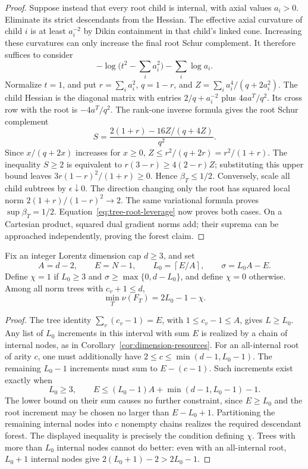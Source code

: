 \begin{proof}
Suppose instead that every root child is internal, with axial values
$a_i>0$.  Eliminate its strict descendants from the Hessian.  The
effective axial curvature of child $i$ is at least $a_i^{-2}$ by
Dikin containment in that child's linked cone.  Increasing these
curvatures can only increase the final root Schur complement.
It therefore suffices to consider
\[
 -\log\bigl(t^2-\textstyle\sum_i a_i^2\bigr)-\sum_i\log a_i.
\]
Normalize $t=1$, and put $r=\sum_i a_i^2$, $q=1-r$, and
$Z=\sum_i a_i^4/(q+2a_i^2)$.  The child Hessian is the diagonal
matrix with entries $2/q+a_i^{-2}$ plus $4aa^T/q^2$.
Its cross row with the root is $-4a^T/q^2$.  The rank-one inverse
formula gives the root Schur complement
\begin{equation}\label{eq:tree-schur-concrete}
 S=\frac{2(1+r)-16Z/(q+4Z)}{q^2}.
\end{equation}
Since $x/(q+2x)$ increases for $x\geq0$,
$Z\leq r^2/(q+2r)=r^2/(1+r)$.
The inequality $S\geq2$ is equivalent to
$r(3-r)\geq4(2-r)Z$; substituting this upper bound leaves
$3r(1-r)^2/(1+r)\geq0$.  Hence $\beta_T\leq1/2$.
Conversely, scale all child subtrees by $\epsilon\downarrow0$.
The direction changing only the root has squared local norm
$2(1+r)/(1-r)^2\to2$.  The same variational formula proves
$\sup\beta_T=1/2$.  Equation~\eqref{eq:tree-root-leverage} now proves
both cases.  On a Cartesian product, squared dual gradient norms add;
their suprema can be approached independently, proving the forest claim.
\end{proof}

\begin{corollary}\label{cor:tree-cap-parameter}
Fix an integer Lorentz dimension cap $d\geq3$, and set
\[
 A=d-2,\qquad E=N-1,\qquad L_0=\left\lceil E/A\right\rceil,
 \qquad \sigma=L_0A-E.
\]
Define $\chi=1$ if $L_0\geq3$ and
$\sigma\geq\max\{0,d-L_0\}$, and define $\chi=0$ otherwise.
Among all norm trees with $c_v+1\leq d$,
\begin{equation}\label{eq:tree-cap-parameter}
 \min_T\nu(F_T)=2L_0-1-\chi.
\end{equation}
\end{corollary}
\begin{proof}
The tree identity $\sum_v(c_v-1)=E$, with $1\leq c_v-1\leq A$,
gives $L\geq L_0$.  Any list of $L_0$ increments in this interval
with sum $E$ is realized by a chain of internal nodes, as in
Corollary~\ref{cor:dimension-resources}.
For an all-internal root of arity $c$, one must additionally have
$2\leq c\leq\min(d-1,L_0-1)$.  The remaining $L_0-1$ increments
must sum to $E-(c-1)$.  Such increments exist exactly when
\[
 L_0\geq3,\qquad
 E\leq (L_0-1)A+\min(d-1,L_0-1)-1.
\]
The lower bound on their sum causes no further constraint, since
$E\geq L_0$ and the root increment may be chosen no larger than
$E-L_0+1$.  Partitioning the remaining internal nodes into $c$
nonempty chains realizes the required descendant forest.
The displayed inequality is precisely the condition defining $\chi$.
Trees with more than $L_0$ internal nodes cannot do better: even with
an all-internal root, $L_0+1$ internal nodes give
$2(L_0+1)-2>2L_0-1$.
\end{proof}

